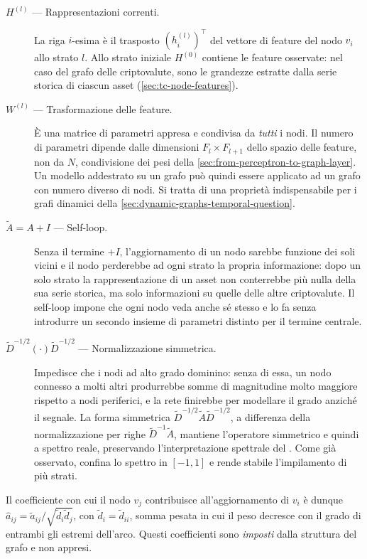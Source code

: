 \begin{description}
    \item[$H^{(l)}$ — Rappresentazioni correnti.] La riga $i$-esima è il trasposto $(h_i^{(l)})^\top$ del vettore di feature del nodo $v_i$ allo strato $l$. Allo strato iniziale $H^{(0)}$ contiene le feature osservate: nel caso del grafo delle criptovalute, sono le grandezze estratte dalla serie storica di ciascun asset (\cref{sec:tc-node-features}).
    \item[$W^{(l)}$ — Trasformazione delle feature.] È una matrice di parametri appresa e condivisa da \emph{tutti} i nodi. Il numero di parametri dipende dalle dimensioni $F_l\times F_{l+1}$ dello spazio delle feature, non da $N$, condivisione dei pesi della \cref{sec:from-perceptron-to-graph-layer}. Un modello addestrato su un grafo può quindi essere applicato ad un grafo con numero diverso di nodi. Si tratta di una proprietà indispensabile per i grafi dinamici della \cref{sec:dynamic-graphs-temporal-question}.
    \item[$\tilde A = A + I$ — Self-loop.] Senza il termine $+I$, l'aggiornamento di un nodo sarebbe funzione dei soli vicini e il nodo perderebbe ad ogni strato la propria informazione: dopo un solo strato la rappresentazione di un asset non conterrebbe più nulla della sua serie storica, ma solo informazioni su quelle delle altre criptovalute. Il self-loop impone che ogni nodo veda anche sé stesso e lo fa senza introdurre un secondo insieme di parametri distinto per il termine centrale.
    \item[$\tilde D^{-1/2}(\cdot)\tilde D^{-1/2}$ — Normalizzazione simmetrica.] Impedisce che i nodi ad alto grado dominino: senza di essa, un nodo connesso a molti altri produrrebbe somme di magnitudine molto maggiore rispetto a nodi periferici, e la rete finirebbe per modellare il grado anziché il segnale. La forma simmetrica $\tilde D^{-1/2}\tilde A\tilde D^{-1/2}$, a differenza della normalizzazione per righe $\tilde D^{-1}\tilde A$, mantiene l'operatore simmetrico e quindi a spettro reale, preservando l'interpretazione spettrale del . Come già osservato, confina lo spettro in $[-1,1]$ e rende stabile l'impilamento di più strati.
\end{description}

Il coefficiente con cui il nodo $v_j$ contribuisce all'aggiornamento di $v_i$ è dunque $\hat a_{ij} = \tilde a_{ij}/\sqrt{\tilde d_i\tilde d_j}$, con $\tilde d_i = \tilde d_{ii}$, somma pesata in cui il peso decresce con il grado di entrambi gli estremi dell'arco. Questi coefficienti sono \emph{imposti} dalla struttura del grafo e non appresi.

